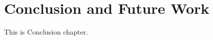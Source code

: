 \fancyhead[RE]{\fontsize{8}{12}\selectfont\leftmark}
\chapter{Conclusion and Future Work}
\label{DFC}


This is Conclusion chapter.








